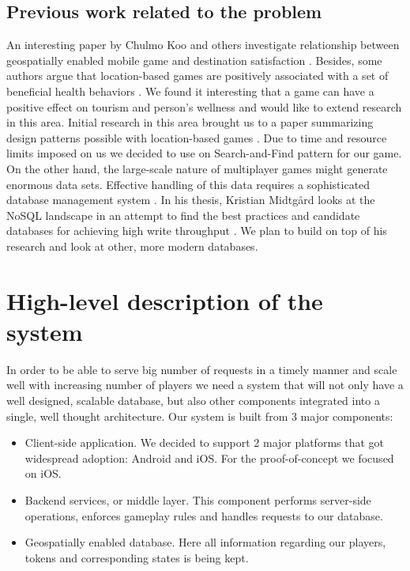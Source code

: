 \documentclass[conference]{IEEEtran}
\begin{document}
\subsection{Previous work related to the problem}
An interesting paper by Chulmo Koo and others investigate relationship between geospatially enabled mobile game and destination satisfaction \cite{destination-engagement}. Besides, some authors argue that location-based games are positively associated with a set of beneficial health behaviors \cite{pokemon-motivation}. We found it interesting that a game can have a positive effect on tourism and person’s wellness and would like to extend research in this area.  
   Initial research in this area brought us to a paper summarizing design patterns possible with location-based games \cite{location-based-mg}. Due to time and resource limits imposed on us we decided to use on Search-and-Find pattern for our game. On the other hand, the large-scale nature of multiplayer games might generate enormous data sets. Effective handling of this data requires a sophisticated database management system \cite{data-store-issues, location-based-services}. In his thesis, Kristian Midtgård looks at the NoSQL landscape in an attempt to find the best practices and candidate databases for achieving high write throughput \cite{massive-amounts-location-data}. We plan to build on top of his research and look at other, more modern databases. 
	
\section{High-level description of the system}
In order to be able to serve big number of requests in a timely manner and scale well with increasing number of players we need a system that will not only have a well designed, scalable database, but also other components integrated into a single, well thought architecture. Our system is built from 3 major components:

\begin{itemize}
  \item Client-side application. We decided to support 2 major platforms that got widespread adoption: Android and iOS. For the proof-of-concept we focused on iOS. 
  \item Backend services, or middle layer. This component performs server-side operations, enforces gameplay rules and handles requests to our database. 
  \item Geospatially enabled database. Here all information regarding our players, tokens and corresponding states is being kept. 
\end{itemize}
\end{document}
